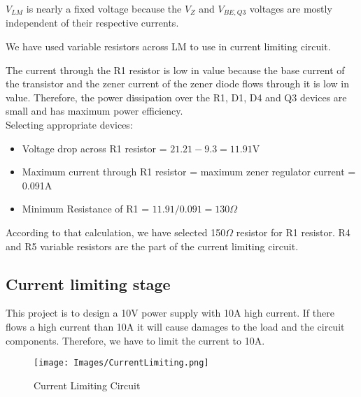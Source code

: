 \documentclass[11pt,a4paper]{article}
\begin{document}
\begin{multicols}{2}
$V_{LM}$ is nearly a fixed voltage because the $V_Z$ and $V_{BE,Q3}$ voltages are mostly independent of their respective currents. 

We have used variable resistors across LM to use in current limiting circuit. 

The current through the R1 resistor is low in value because the base current of the transistor and the zener current of the zener diode flows through it is low in value. Therefore, the power dissipation over the R1, D1, D4 and Q3 devices are small and has maximum power efficiency.\\

Selecting appropriate devices:\vspace{-0.1in}
\begin{itemize}
  \item Voltage drop across R1 resistor = $21.21 - 9.3 = 11.91$V \vspace{-0.1in}
\item Maximum current through R1 resistor = maximum zener regulator current = 0.091A \vspace{-0.1in}
\item Minimum Resistance of R1 = $11.91/0.091=130 \Omega$ \vspace{-0.1in}
\end{itemize}

According to that calculation, we have selected 150$\Omega$ resistor for R1 resistor. R4 and R5 variable resistors are the part of the current limiting circuit.


\subsection{Current limiting stage}
This project is to design a 10V power supply with 10A high current. If there flows a high current than 10A it will cause damages to the load and the circuit components. Therefore, we have to limit the current to 10A.

\begin{figure}[H]
    \centering
\texttt{[image: Images/CurrentLimiting.png]}
    \caption{Current Limiting Circuit}
    \label{fig:ProtectionCircuit}
\end{figure}




\end{multicols}
\end{document}

